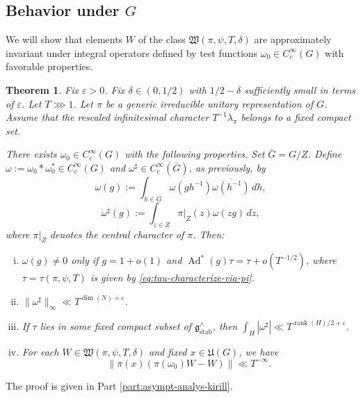 \documentclass[reqno]{amsart}
\DeclareMathOperator{\Ad}{Ad}
\def\eps{\varepsilon}
\DeclareMathOperator{\stab}{stab}
\DeclareMathOperator{\rank}{rank}
\theoremstyle{plain} \newtheorem{theorem} {Theorem}
\theoremstyle{definition} \newtheorem{definition} [theorem] {Definition}
\theoremstyle{itplain} %
\numberwithin{equation}{section}
\numberwithin{theorem}{section}
\begin{document}
\subsection{Behavior under $G$}\label{sec:behavior-under-g}
We will show that elements $W$ of the class $\mathfrak{W}(\pi,\psi,T,\delta)$ are approximately invariant under integral operators defined by test functions $\omega_0 \in C_c^\infty(G)$ with favorable properties.

\begin{theorem}\label{thm:big-group-whittaker-behavior-under-G}
  Fix $\eps > 0$.  Fix $\delta \in (0,1/2)$ with $1/2 - \delta$ sufficiently small in terms of $\eps$.  Let $T \ggg 1$.  Let $\pi$ be a generic irreducible unitary representation of $G$.  Assume that the rescaled infinitesimal character $T^{-1} \lambda_\pi$ belongs to a fixed compact set.
  
  There exists $\omega_0 \in C_c^\infty(G)$ with the following properties.  Set $\bar{G} = G/Z$.  Define $\omega := \omega_0 \ast \omega_0^\ast \in C_c^\infty(G)$ and $\omega^\sharp \in C_c^\infty(\bar{G})$, as previously, by
  \begin{equation*}
    \omega(g) := \int _{h \in G} \omega(g h^{-1}) \overline{\omega(h^{-1})} \, d h,
  \end{equation*}
  \begin{equation*}
    \omega^\sharp (g) := \int _{z \in Z}
    \pi|_Z (z) \omega(z g) \, d z,
  \end{equation*}
  where $\pi|_Z$ denotes the central character of $\pi$.  Then:
  \begin{enumerate}[(i)]
  \item  $\omega(g) \neq 0$ only if $g = 1 + o(1)$ and $\Ad^*(g) \tau = \tau + o(T^{-1/2})$, where $\tau = \tau(\pi,\psi,T)$ is given by \eqref{eq:tau-characterize-via-pi}.
  \item $\|\omega^\sharp\|_{\infty} \ll T^{\dim(N)+\eps}$.
  \item If $\tau$ lies in some fixed compact subset of $\mathfrak{g}^\wedge_{\stab}$, then $\int_H |\omega^\sharp| \ll T^{\rank(H)/2 + \eps}$.
  \item For each $W \in \mathfrak{W}(\pi,\psi,T,\delta)$ and fixed $x \in \mathfrak{U}(G)$, we have
    \begin{equation*}
      \|\pi(x) (\pi(\omega_0)W - W)\| \ll T^{-\infty}.
    \end{equation*}
  \end{enumerate}
\end{theorem}
The proof is given in Part \ref{part:asympt-analys-kirill}.
\end{document}
